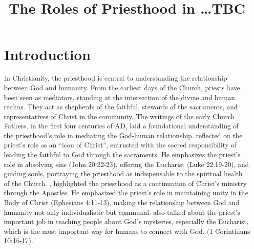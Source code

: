 \documentclass[12pt, doc]{apa7}   	%
\title{The Roles of Priesthood in \dots TBC}
\begin{document}
\maketitle





\section{Introduction}

In Christianity, the priesthood is central to understanding the relationship between God and humanity. From the earliest days of the Church, priests have been seen as mediators, standing at the intersection of the divine and human realms. They act as shepherds of the faithful, stewards of the sacraments, and representatives of Christ in the community. The writings of the early Church Fathers, in the first four centuries of AD, laid a foundational understanding of the priesthood’s role in mediating the God-human relationship.  \citet{priesthood_chrysostom, complete_work_chrysostom} reflected on the priest’s role as an ``icon of Christ'', entrusted with the sacred responsibility of leading the faithful to God through the sacraments. He emphasizes the priest’s role in absolving sins (John 20:22-23), offering the Eucharist (Luke 22:19-20), and guiding souls, portraying the priesthood as indispensable to the spiritual health of the Church.  \citet{epistles_ignatius}, highlighted the priesthood as a continuation of Christ’s ministry through the Apostles. He emphasized the priest’s role in maintaining unity in the Body of Christ (Ephesians 4:11-13), making the relationship between God and humanity not only individualistic but communal. \citet{st_basil_letters} also talked about the priest’s important job in teaching people about God’s mysteries, especially the Eucharist, which is the most important way for humans to connect with God. (1 Corinthians 10:16-17). 
\end{document}
